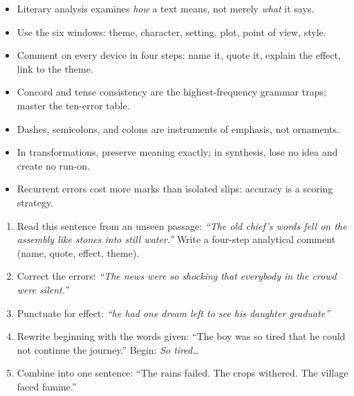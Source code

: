 \documentclass[11pt]{article}
\begin{document}
\begin{aretenir}
\begin{itemize}
\item Literary analysis examines \emph{how} a text means, not merely \emph{what} it says.
\item Use the six windows: theme, character, setting, plot, point of view, style.
\item Comment on every device in four steps: name it, quote it, explain the effect, link to the theme.
\item Concord and tense consistency are the highest-frequency grammar traps; master the ten-error table.
\item Dashes, semicolons, and colons are instruments of emphasis, not ornaments.
\item In transformations, preserve meaning exactly; in synthesis, lose no idea and create no run-on.
\item Recurrent errors cost more marks than isolated slips: accuracy is a scoring strategy.
\end{itemize}
\end{aretenir}

\begin{exercice}
\begin{enumerate}
\item Read this sentence from an unseen passage: \emph{``The old chief's words fell on the assembly like stones into still water.''} Write a four-step analytical comment (name, quote, effect, theme).
\item Correct the errors: \emph{``The news were so shocking that everybody in the crowd were silent.''}
\item Punctuate for effect: \emph{``he had one dream left to see his daughter graduate''}
\item Rewrite beginning with the words given: ``The boy was so tired that he could not continue the journey.'' Begin: \emph{So tired\ldots}
\item Combine into one sentence: ``The rains failed. The crops withered. The village faced famine.''
\end{enumerate}
\end{exercice}
\end{document}
